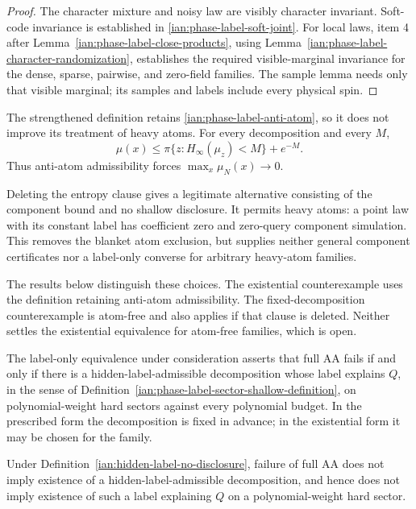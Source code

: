 \begin{proof}
The character mixture and noisy law are visibly character invariant. Soft-code invariance is established in
\eqref{ian:phase-label-soft-joint}. For local laws, item 4 after
Lemma~\ref{ian:phase-label-close-products}, using
Lemma~\ref{ian:phase-label-character-randomization}, establishes the required visible-marginal invariance for the dense, sparse, pairwise, and zero-field families. The sample lemma needs only that visible marginal; its samples and labels include every physical spin.
\end{proof}

\begin{remark}
\label{ian:hidden-label-heavy-atoms}
The strengthened definition retains \eqref{ian:phase-label-anti-atom}, so it does not improve its treatment of heavy atoms. For every decomposition and every \(M\),
\[
 \mu(x)\le
 \pi\{z:H_\infty(\mu_z)<M\}+e^{-M}.
\]
Thus anti-atom admissibility forces \(\max_x\mu_N(x)\to0\).

Deleting the entropy clause gives a legitimate alternative consisting of the component bound and no shallow disclosure. It permits heavy atoms: a point law with its constant label has coefficient zero and zero-query component simulation. This removes the blanket atom exclusion, but supplies neither general component certificates nor a label-only converse for arbitrary heavy-atom families.

The results below distinguish these choices. The existential counterexample uses the definition retaining anti-atom admissibility. The fixed-decomposition counterexample is atom-free and also applies if that clause is deleted. Neither settles the existential equivalence for atom-free families, which is open.
\end{remark}

The label-only equivalence under consideration asserts that full AA fails if and only if there is a hidden-label-admissible decomposition whose label explains \(Q\), in the sense of Definition~\ref{ian:phase-label-sector-shallow-definition}, on polynomial-weight hard sectors against every polynomial budget. In the prescribed form the decomposition is fixed in advance; in the existential form it may be chosen for the family.

\begin{proposition}
\label{ian:hidden-label-existential-equivalence-false}
Under Definition~\ref{ian:hidden-label-no-disclosure}, failure of full AA does not imply existence of a hidden-label-admissible decomposition, and hence does not imply existence of such a label explaining \(Q\) on a polynomial-weight hard sector.
\end{proposition}

